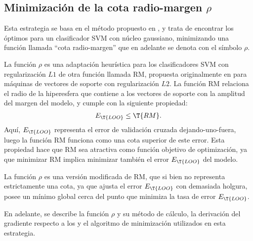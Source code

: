 %
%
\subsection{Minimización de la cota radio-margen ${\rho}$}
%
Esta estrategia se basa en el método propuesto en \cite{chung}, y
trata de encontrar los  óptimos para un clasificador SVM con
núcleo gaussiano, minimizando una función llamada ``cota
radio-margen'' que en adelante se denota con el símbolo $\rho$.

La función $\rho$ es una adaptación heurística para los clasificadores
SVM con regularización $L1$ de otra función llamada {RM}, propuesta
originalmente en \cite{vapnik} para máquinas de vectores de soporte
con regularización $L2$.
La función {RM} relaciona el radio de la hiperesfera que contiene a
los vectores de soporte con la amplitud del margen del modelo, y
cumple con la siguiente propiedad:
%
\begin{align}
  E_{\T{LOO}} \leq \T{RM}.
\end{align}
%
Aquí, $E_{\T{LOO}}$ representa el error de validación cruzada
dejando-uno-fuera, luego la función {RM} funciona como una cota
superior de este error.
Esta propiedad hace que {RM} sea atractiva como función objetivo de
optimización, ya que minimizar {RM} implica minimizar también el error
$E_{\T{LOO}}$ del modelo.

La función $\rho$ es una versión modificada de {RM}, que si bien no
representa estrictamente una cota, ya que ajusta el error
$E_{\T{LOO}}$ con demasiada holgura, posee un mínimo global cerca del
punto que minimiza la tasa de error $E_{\T{LOO}}$.

En adelante, se describe la función $\rho$ y su método de cálculo, la
derivación del gradiente respecto a los  y el algoritmo de
minimización utilizados en esta estrategia.
